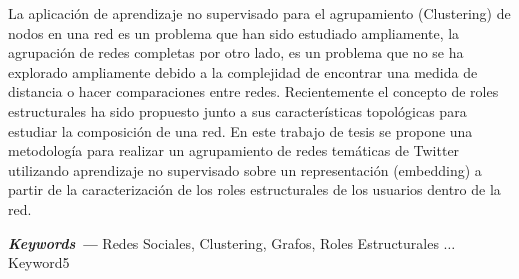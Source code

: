 \label{sec:abstract}

La aplicación de aprendizaje no supervisado para el agrupamiento (Clustering) de nodos en una red es un problema que han sido estudiado ampliamente, la agrupación de redes completas por otro lado, es un problema que no se ha explorado ampliamente debido a la complejidad de encontrar una medida de distancia o hacer comparaciones entre redes. Recientemente el concepto de roles estructurales ha sido propuesto junto a sus características topológicas para estudiar la composición de una red. En este trabajo de tesis se propone una metodología para realizar un agrupamiento de redes temáticas de Twitter utilizando aprendizaje no supervisado sobre un representación (embedding) a partir de la caracterización de los roles estructurales de los usuarios dentro de la red.

{\vspace{5mm}\textbf{\textit{Keywords ---}} Redes Sociales, Clustering, Grafos, Roles Estructurales $\ldots$ Keyword5} 